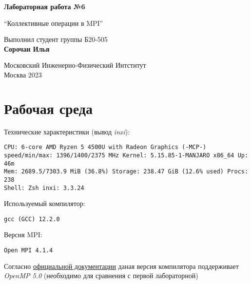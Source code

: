 \documentclass[a4paper, 12pt]{article}
\begin{document}
\hypersetup{pageanchor=false}
\begin{titlepage}
 \begin{center}
  \vspace*{1cm}

  \Huge
  \textbf{Лабораторная работа №6}

  \vspace{0.5cm}
  \LARGE
  ``Коллективные операции в MPI''

  \vspace{1.5cm}
  Выполнил студент группы Б20-505\\
  \textbf{Сорочан Илья}

  \vfill

  \Large
  Московский Инженерно-Физический Интститут\\
  Москва 2023

 \end{center}
\end{titlepage}



\section{Рабочая среда}

Технические характеристики (вывод \textit{inxi}):
\begin{verbatim}
CPU: 6-core AMD Ryzen 5 4500U with Radeon Graphics (-MCP-)
speed/min/max: 1396/1400/2375 MHz Kernel: 5.15.85-1-MANJARO x86_64 Up: 46m
Mem: 2689.5/7303.9 MiB (36.8%) Storage: 238.47 GiB (12.6% used) Procs: 238
Shell: Zsh inxi: 3.3.24
\end{verbatim}

Используемый компилятор:
\begin{verbatim}
gcc (GCC) 12.2.0
\end{verbatim}

Версия MPI:
\begin{verbatim}
Open MPI 4.1.4
\end{verbatim}

Согласно \href{https://www.openmp.org/resources/openmp-compilers-tools/}{официальной документации} даная версия компилятора поддерживает \textit{OpenMP 5.0} (необходимо для сравнения с первой лабораторной)


\end{document}
